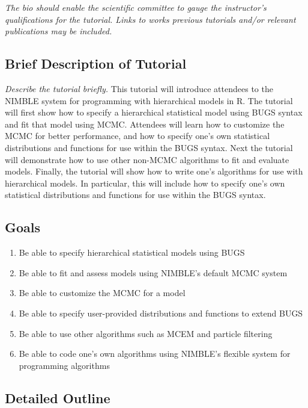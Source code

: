 \documentclass[]{article}
\providecommand{\tightlist}{%
  \setlength{\itemsep}{0pt}\setlength{\parskip}{0pt}}
\begin{document}
\emph{The bio should enable the scientific committee to gauge the
instructor's qualifications for the tutorial. Links to works previous
tutorials and/or relevant publications may be included.}

\subsection{Brief Description of
Tutorial}\label{brief-description-of-tutorial}
\emph{Describe the tutorial briefly.}
This tutorial will introduce attendees to the NIMBLE system for programming with hierarchical models in R. The tutorial will first show how to specify a hierarchical statistical model using BUGS syntax and fit that model using MCMC. Attendees will learn how to customize the MCMC for better performance, and how to specify one's own statistical distributions and functions for use within the BUGS syntax. Next the tutorial will demonstrate how to use other non-MCMC algorithms to fit and evaluate models. Finally, the tutorial will show how to write one's algorithms for use with hierarchical models. In particular, this will include how to specify one's own statistical distributions and functions for use within the BUGS syntax.



\subsection{Goals}\label{goals}

\begin{enumerate}
\def\labelenumi{\arabic{enumi}.}
\tightlist
\item
 Be able to specify hierarchical statistical models using BUGS
\item
 Be able to fit and assess models using NIMBLE's default MCMC system
\item
  Be able to customize the MCMC for a model
\item
  Be able to specify user-provided distributions and functions to extend BUGS
\item
Be able to use other algorithms such as MCEM and particle filtering
\item
Be able to code one's own algorithms using NIMBLE's flexible system for programming algorithms
\end{enumerate}

\subsection{Detailed Outline}\label{detailed-outline}
\end{document}
